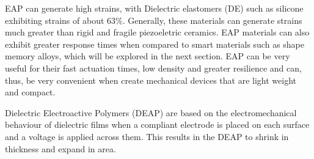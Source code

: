 EAP can generate high strains, with Dielectric elastomers (DE) such as silicone exhibiting strains of about 63\%\cite{kornbluh_electroactive_2004}. Generally, these materials can generate strains much greater than rigid and fragile piezoeletric ceramics. EAP materials can also exhibit greater response times when compared to smart materials such as shape memory alloys, which will be explored in the next section. EAP can be very useful for their fast actuation times, low density and greater resilience and can, thus, be very convenient when create mechanical devices that are light weight and compact.

Dielectric Electroactive Polymers (DEAP) are based on the electromechanical behaviour of dielectric films when a compliant electrode is placed on each surface and a voltage is applied across them. This results in the DEAP to shrink in thickness and expand in area.

